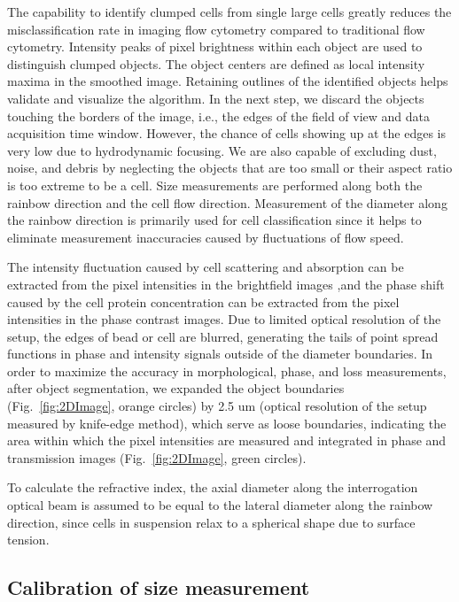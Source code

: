 \documentclass[aps,pra,preprint,superscriptaddress]{revtex4-1}
\begin{document}
The capability to identify clumped cells from single large cells greatly reduces the misclassification rate in imaging flow cytometry compared to traditional flow cytometry. Intensity peaks of pixel brightness within each object are used to distinguish clumped objects. The object centers are defined as local intensity maxima in the smoothed image. Retaining outlines of the identified objects helps validate and visualize the algorithm. In the next step, we discard the objects touching the borders of the image, i.e., the edges of the field of view and data acquisition time window. However, the chance of cells showing up at the edges is very low due to hydrodynamic focusing. We are also capable of excluding dust, noise, and debris by neglecting the objects that are too small or their aspect ratio is too extreme to be a cell. Size measurements are performed along both the rainbow direction and the cell flow direction. Measurement of the diameter along the rainbow direction is primarily used for cell classification since it helps to eliminate measurement inaccuracies caused by fluctuations of flow speed. 

The intensity fluctuation caused by cell scattering and absorption can be extracted from the pixel intensities in the brightfield images ,and the phase shift caused by the cell protein concentration can be extracted from the pixel intensities in the phase contrast images. Due to limited optical resolution of the setup, the edges of bead or cell are blurred, generating the tails of point spread functions in phase and intensity signals outside of the diameter boundaries. In order to maximize the accuracy in morphological, phase, and loss measurements, after object segmentation, we expanded the object boundaries (Fig.~\ref{fig:2DImage}, orange circles) by 2.5 um (optical resolution of the setup measured by knife-edge method), which serve as loose boundaries, indicating the area within which the pixel intensities are measured and integrated in phase and transmission images (Fig.~\ref{fig:2DImage}, green circles).

To calculate the refractive index, the axial diameter along the interrogation optical beam is assumed to be equal to the lateral diameter along the rainbow direction, since cells in suspension relax to a spherical shape due to surface tension.

\subsection{Calibration of size measurement}
\end{document}
